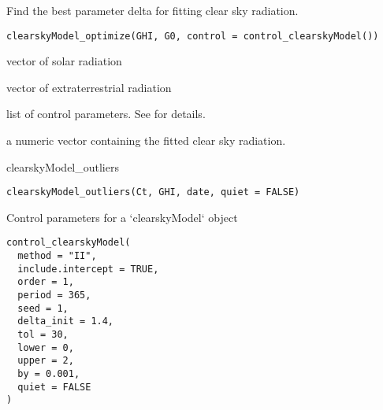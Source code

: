 \documentclass[a4paper]{book}
\begin{document}
%
\begin{Description}\relax
Find the best parameter delta for fitting clear sky radiation.
\end{Description}
%
\begin{Usage}
\begin{verbatim}
clearskyModel_optimize(GHI, G0, control = control_clearskyModel())
\end{verbatim}
\end{Usage}
%
\begin{Arguments}
\begin{ldescription}
\item[\code{GHI}] vector of solar radiation

\item[\code{G0}] vector of extraterrestrial radiation

\item[\code{control}] list of control parameters. See  for details.
\end{ldescription}
\end{Arguments}
%
\begin{Value}
a numeric vector containing the fitted clear sky radiation.
\end{Value}
%
\begin{Description}\relax
clearskyModel\_outliers
\end{Description}
%
\begin{Usage}
\begin{verbatim}
clearskyModel_outliers(Ct, GHI, date, quiet = FALSE)
\end{verbatim}
\end{Usage}
%
\begin{Description}\relax
Control parameters for a `clearskyModel` object
\end{Description}
%
\begin{Usage}
\begin{verbatim}
control_clearskyModel(
  method = "II",
  include.intercept = TRUE,
  order = 1,
  period = 365,
  seed = 1,
  delta_init = 1.4,
  tol = 30,
  lower = 0,
  upper = 2,
  by = 0.001,
  quiet = FALSE
)
\end{verbatim}
\end{Usage}
\end{document}
